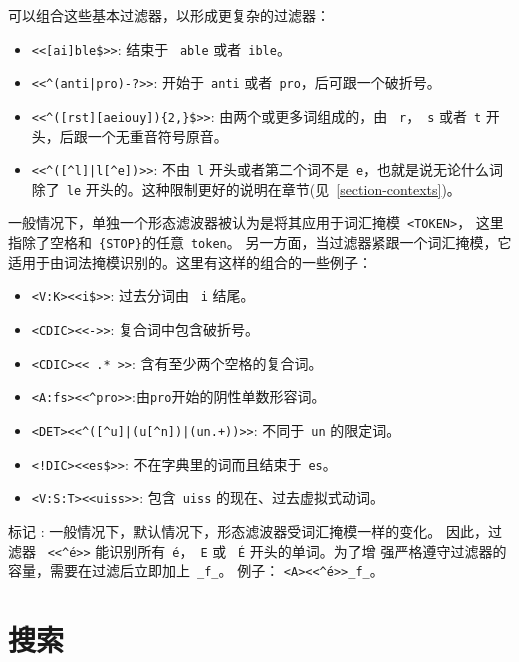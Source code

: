 \bigskip
\noindent 可以组合这些基本过滤器，以形成更复杂的过滤器：

\begin{itemize}
\item \verb+<<[ai]ble$>>+: 结束于 \ \verb$able$ 或者\ \verb$ible$。
\item \verb$<<^(anti|pro)-?>>$: 开始于\ \verb$anti$ 或者\ \verb$pro$，后可跟一个破折号。
  \item \verb+<<^([rst][aeiouy]){2,}$>>+: 由两个或更多词组成的，由 \ \verb$r$，\ \verb$s$ 或者\ \verb$t$ 开头，后跟一个无重音符号原音。
  \item \verb!<<^([^l]|l[^e])>>!: 不由\ \verb$l$ 开头或者第二个词不是\ \verb$e$，也就是说无论什么词除了\ \verb$le$ 开头的。这种限制更好的说明在章节(见~\ref{section-contexts})。
\end{itemize}

\noindent 一般情况下，单独一个形态滤波器被认为是将其应用于词汇掩模\ \verb$<TOKEN>$， 这里指除了空格和\ \verb+{STOP}+的任意\ \verb+token+。
另一方面，当过滤器紧跟一个词汇掩模，它适用于由词法掩模识别的。这里有这样的组合的一些例子：



\begin{itemize}
  \item \verb+<V:K><<i$>>+: 过去分词由 \ \verb$i$ 结尾。
  \item \verb!<CDIC><<->>!: 复合词中包含破折号。
  \item \verb!<CDIC><< .* >>!: 含有至少两个空格的复合词。
  \item \verb!<A:fs><<^pro>>!:由\verb$pro$开始的阴性单数形容词。
  \item \verb!<DET><<^([^u]|(u[^n])|(un.+))>>!: 不同于\ \verb$un$ 的限定词。
  \item \verb+<!DIC><<es$>>+: 不在字典里的词而且结束于\ \verb$es$。
  \item \verb!<V:S:T><<uiss>>!: 包含\ \verb$uiss$ 的现在、过去虚拟式动词。
\end{itemize}

\noindent {}标记 : 一般情况下，默认情况下，形态滤波器受词汇掩模一样的变化。 因此，过滤器 \ \verb$<<^é>>$ 能识别所有\ \texttt{é}，\ \texttt{E} 或 \ \texttt{É} 开头的单词。为了增
强严格遵守过滤器的容量，需要在过滤后立即加上\ \verb+_f_+。 例子： \verb+<A><<^é>>_f_+。



\section{搜索}
